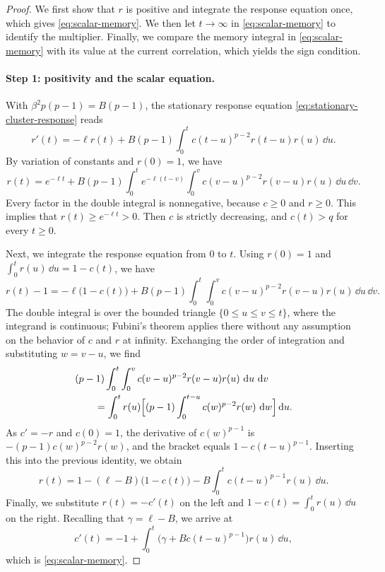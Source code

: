 \begin{proof}
We first show that $r$ is positive and integrate the response equation once, which gives \eqref{eq:scalar-memory}. We then let $t\to\infty$ in \eqref{eq:scalar-memory} to identify the multiplier. Finally, we compare the memory integral in \eqref{eq:scalar-memory} with its value at the current correlation, which yields the sign condition.

\paragraph{Step 1: positivity and the scalar equation.}
With $\beta^2p(p-1)=B(p-1)$, the stationary response equation \eqref{eq:stationary-cluster-response} reads
\[
 r'(t)=-\ell r(t)+B(p-1)\int_0^tc(t-u)^{p-2}r(t-u)r(u)\,\dd u.
\]
By variation of constants and $r(0)=1$, we have
\[
 r(t)=e^{-\ell t}+B(p-1)\int_0^te^{-\ell(t-v)}\int_0^vc(v-u)^{p-2}r(v-u)r(u)\,\dd u\,\dd v.
\]
Every factor in the double integral is nonnegative, because $c\ge0$ and $r\ge0$. This implies that $r(t)\ge e^{-\ell t}>0$. Then $c$ is strictly decreasing, and $c(t)>q$ for every $t\ge0$.

Next, we integrate the response equation from $0$ to $t$. Using $r(0)=1$ and $\int_0^tr(u)\,\dd u=1-c(t)$, we have
\[
 r(t)-1=-\ell\bigl(1-c(t)\bigr)+B(p-1)\int_0^t\int_0^vc(v-u)^{p-2}r(v-u)r(u)\,\dd u\,\dd v.
\]
The double integral is over the bounded triangle $\{0\le u\le v\le t\}$, where the integrand is continuous; Fubini's theorem applies there without any assumption on the behavior of $c$ and $r$ at infinity. Exchanging the order of integration and substituting $w=v-u$, we find
\[
\begin{aligned}
 &(p-1)\int_0^t\int_0^vc(v-u)^{p-2}r(v-u)r(u)\,\mathop{}\!\mathrm d u\,\mathop{}\!\mathrm d v\\
 &\qquad=\int_0^tr(u)\Bigl[(p-1)\int_0^{t-u}c(w)^{p-2}r(w)\,\mathop{}\!\mathrm d w\Bigr]\mathop{}\!\mathrm d u.
\end{aligned}
\]
As $c'=-r$ and $c(0)=1$, the derivative of $c(w)^{p-1}$ is $-(p-1)c(w)^{p-2}r(w)$, and the bracket equals $1-c(t-u)^{p-1}$. Inserting this into the previous identity, we obtain
\[
 r(t)=1-(\ell-B)\bigl(1-c(t)\bigr)-B\int_0^tc(t-u)^{p-1}r(u)\,\dd u.
\]
Finally, we substitute $r(t)=-c'(t)$ on the left and $1-c(t)=\int_0^tr(u)\,\dd u$ on the right. Recalling that $\gamma=\ell-B$, we arrive at
\[
 c'(t)=-1+\int_0^t\bigl(\gamma+Bc(t-u)^{p-1}\bigr)r(u)\,\dd u,
\]
which is \eqref{eq:scalar-memory}.


\end{proof}
